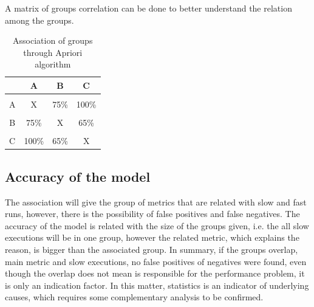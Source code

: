 A matrix of groups correlation can be done to better understand the relation among the groups.


    
\begin{table}[h]
\centering
\begin{tabular}{cccc}
                      & A                         & B                        & C     \\ \hline
                      &                           &                          &       \\ 
A                     & X                         & 75\%                     & 100\% \\ \hline
                      &                           &                          &       \\ 
B                     & 75\%                      & X                        & 65\%  \\ \hline
                      &                           &                          &       \\
\multicolumn{1}{l}{C} & \multicolumn{1}{l}{100\%} & \multicolumn{1}{l}{65\%} & X     \\ \hline
\end{tabular}
\vspace{10pt}
\caption{Association of groups through Apriori algorithm}
\label{fig:association}
\end{table}

\subsection{Accuracy of the model}
The association will give the group of metrics that are related with slow and fast runs, however, there is the possibility of false positives and false negatives. The accuracy of the model is related with the size of the groups given, i.e. the all slow executions will be in one group, however the related metric, which explains the reason, is bigger than the associated group.  In summary, if the groups overlap, main metric and slow executions, no false positives of negatives were found, even though the overlap does not mean is responsible for the performance problem, it is only an indication factor. In this matter, statistics is an indicator of underlying causes, which requires some complementary analysis to be confirmed.
